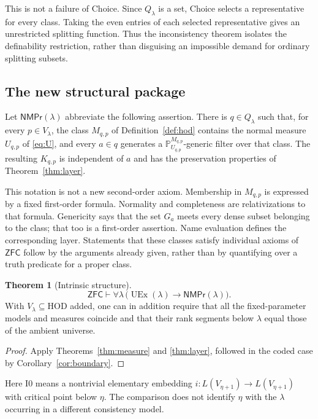 \documentclass[11pt,letterpaper]{article}
\theoremstyle{definition}
\newtheorem{theorem}[definition]{Theorem}
\numberwithin{equation}{section}
\newcommand{\ZFC}{\mathsf{ZFC}}
\newcommand{\HOD}{\mathrm{HOD}}
\newcommand{\UEx}{\operatorname{UEx}}
\newcommand{\Izero}{\mathrm{I0}}
\newcommand{\PP}{\mathbb P}
\newcommand{\NMPr}{\mathsf{NMPr}}
\begin{document}
This is not a failure of Choice. Since $Q_\lambda$ is a set, Choice
selects a representative for every class. Taking the even entries
of each selected representative gives an unrestricted splitting
function. Thus the inconsistency theorem isolates the definability
restriction, rather than disguising an impossible demand for ordinary
splitting subsets.

\subsection{The new structural package}

Let $\NMPr(\lambda)$ abbreviate the following assertion. There is
$q\in Q_\lambda$ such that, for every $p\in V_\lambda$, the class
$M_{q,p}$ of Definition~\ref{def:hod} contains the normal measure
$U_{q,p}$ of \eqref{eq:U}, and every $a\in q$ generates a
$\PP_{U_{q,p}}^{M_{q,p}}$-generic filter over that class. The resulting
$K_{q,p}$ is independent of $a$ and has the preservation properties
of Theorem~\ref{thm:layer}.

This notation is not a new second-order axiom. Membership in
$M_{q,p}$ is expressed by a fixed first-order formula. Normality and
completeness are relativizations to that formula. Genericity says
that the set $G_a$ meets every dense subset belonging to the class;
that too is a first-order assertion. Name evaluation defines the
corresponding layer. Statements that these classes satisfy individual
axioms of $\ZFC$ follow by the arguments already given, rather than
by quantifying over a truth predicate for a proper class.

\begin{theorem}[Intrinsic structure]\label{thm:package}
\[
 \ZFC\vdash\forall\lambda\,
       \bigl(\UEx(\lambda)\longrightarrow\NMPr(\lambda)\bigr).
\]
With $V_\lambda\subseteq\HOD$ added, one can in addition require that
all the fixed-parameter models and measures coincide and that their
rank segments below $\lambda$ equal those of the ambient universe.
\end{theorem}

\begin{proof}
Apply Theorems~\ref{thm:measure} and \ref{thm:layer}, followed in the
coded case by Corollary~\ref{cor:boundary}.
\end{proof}

Here $\Izero$ means a nontrivial elementary embedding
$i:L(V_{\eta+1})\to L(V_{\eta+1})$ with critical point below
$\eta$. The comparison does not identify $\eta$ with the
$\lambda$ occurring in a different consistency model.
\end{document}
